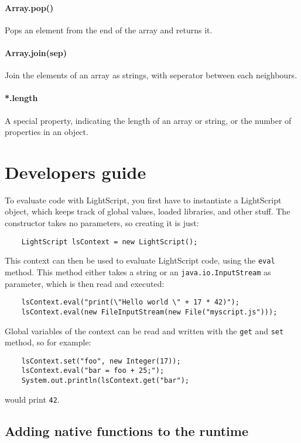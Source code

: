 \documentclass[11pt]{report}
\begin{document}
\paragraph{Array.pop()} Pops an element from the end of the array and returns it.
\paragraph{Array.join(sep)} Join the elements of an array as strings, with seperator between each neighbours.
\paragraph{*.length} A special property, indicating the length of an array or string, or the number of properties in an object.





\section{Developers guide}
To evaluate code with LightScript, you first have to instantiate a LightScript object, which keeps track of global values, loaded libraries, and other stuff. The constructor takes no parameters, so creating it is just:
\begin{lstlisting}
    LightScript lsContext = new LightScript();
\end{lstlisting}
This context can then be used to evaluate LightScript code, using the \verb|eval| method. This method either takes a string or an \verb|java.io.InputStream| as parameter, which is then read and executed:
\begin{lstlisting}
    lsContext.eval("print(\"Hello world \" + 17 * 42)");
    lsContext.eval(new FileInputStream(new File("myscript.js")));
\end{lstlisting}
Global variables of the context can be read and written with the \verb|get| and \verb|set| method, so for example:
\begin{lstlisting}
    lsContext.set("foo", new Integer(17));
    lsContext.eval("bar = foo + 25;");
    System.out.println(lsContext.get("bar");
\end{lstlisting}
would print \verb|42|.

\subsection{Adding native functions to the runtime}
\end{document}
